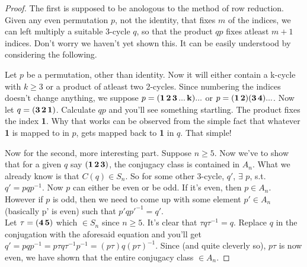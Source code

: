 \documentclass[12pt]{article}
\begin{document}
\begin{proof}
The first is supposed to be anologous to the method of row reduction. Given any even permutation $p$, not the identity, that fixes $m$ of the indices, we can left multiply a suitable 3-cycle $q$, so that the product $qp$ fixes atleast $m+1$ indices. Don't worry we haven't yet shown this. It can be easily understood by considering the following. 
\par
Let $p$ be a permutation, other than identity. Now it will either contain a k-cycle with $k \geq 3$ or a product of atleast two 2-cycles. Since numbering the indices doesn't change anything, we suppose $p=({\bf 1\,2\,3\,...\,k})...$ or $p=({\bf1\,2})({\bf3\,4})...$. Now let $q=({\bf 3\,2\,1})$. Calculate $qp$ and you'll see something startling. The product fixes the index {\bf 1}. Why that works can be observed from the simple fact that whatever {\bf1} is mapped to in $p$, gets mapped back to {\bf 1} in $q$. That simple!
\par
Now for the second, more interesting part. Suppose $n \geq 5$. Now we've to show that for a given $q$ say $({\bf1\,2\,3})$, the conjugacy class is contained in $A_{n}$. What we already know is that $C(q) \in S_{n}$. So for some other 3-cycle, $q'$, $\exists\,\,p$, s.t. $q'=pqp^{-1}$. Now $p$ can either be even or be odd. If it's even, then $p \in A_{n}$. However if $p$ is odd, then we need to come up with some element $p' \in A_{n}$ (basically p' is even) such that $p'qp'^{-1} = q'$.\\ Let $\tau =({\bf 4\,5})$ which $\in S_{n}$ since $n\geq 5$. It's clear that $\tau q \tau^{-1} = q$. Replace $q$ in the conjugation with the aforesaid equation and you'll get $q'=pqp^{-1}=p\tau q \tau ^{-1} p^{-1} = (p\tau) q (p\tau)^{-1}$. Since (and quite cleverly so), $p\tau$ is now even, we have shown that the entire conjugacy class $\in A_{n}$.
\end{proof}
\par


\end{document}
